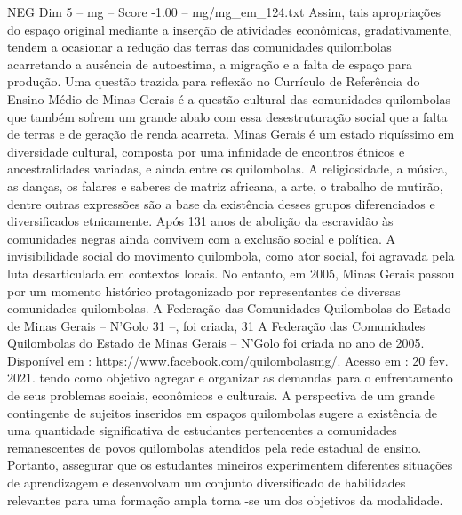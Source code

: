 \begin{textsample}{NEG Dim 5 – mg – Score -1.00 – mg/mg\_em\_124.txt}
Assim, tais apropriações do espaço original mediante a inserção de atividades econômicas, gradativamente, tendem a ocasionar a redução das terras das comunidades quilombolas acarretando a ausência de autoestima, a migração e a falta de espaço para produção.
Uma questão trazida para reflexão no Currículo de Referência do Ensino Médio de Minas Gerais é a questão cultural das comunidades quilombolas que também sofrem um grande abalo com essa desestruturação social que a falta de terras e de geração de renda acarreta.
Minas Gerais é um estado riquíssimo em diversidade cultural, composta por uma infinidade de encontros étnicos e ancestralidades variadas, e ainda entre os quilombolas.
A religiosidade, a música, as danças, os falares e saberes de matriz africana, a arte, o trabalho de mutirão, dentre outras expressões são a base da existência desses grupos diferenciados e diversificados etnicamente.
Após 131 anos de abolição da escravidão às comunidades negras ainda convivem com a exclusão social e política.
A invisibilidade social do movimento quilombola, como ator social, foi agravada pela luta desarticulada em contextos locais.
No entanto, em 2005, Minas Gerais passou por um momento histórico protagonizado por representantes de diversas comunidades quilombolas.
A Federação das Comunidades Quilombolas do Estado de Minas Gerais – N’Golo 31 –, foi criada, 31 A Federação das Comunidades Quilombolas do Estado de Minas Gerais – N’Golo foi criada no ano de 2005.
Disponível em : https://www.facebook.com/quilombolasmg/.
Acesso em : 20 fev. 2021. tendo como objetivo agregar e organizar as demandas para o enfrentamento de seus problemas sociais, econômicos e culturais.
A perspectiva de um grande contingente de sujeitos inseridos em espaços quilombolas sugere a existência de uma quantidade significativa de estudantes pertencentes a comunidades remanescentes de povos quilombolas atendidos pela rede estadual de ensino.
Portanto, assegurar que os estudantes mineiros experimentem diferentes situações de aprendizagem e desenvolvam um conjunto diversificado de habilidades relevantes para uma formação ampla torna -se um dos objetivos da modalidade.

\end{textsample}
